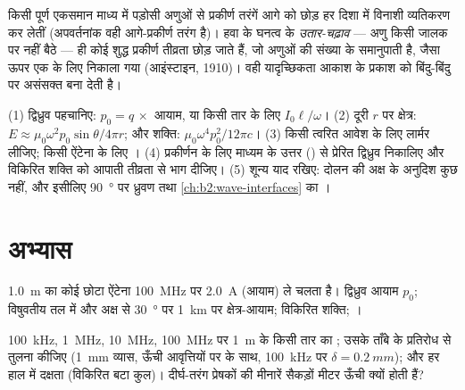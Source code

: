 \begin{remark}[नीला प्रकाश हम तक पहुँचता ही क्यों है]\label{rem:b2:dipole-radiation:why}
किसी पूर्ण एकसमान माध्य में पड़ोसी अणुओं से प्रकीर्ण तरंगें आगे को छोड़
हर दिशा में विनाशी व्यतिकरण कर लेतीं
(अपवर्तनांक वही आगे-प्रकीर्ण तरंग है)। हवा के घनत्व के
\emph{उतार-चढ़ाव} --- अणु किसी जालक पर नहीं बैठे --- ही कोई शुद्ध प्रकीर्ण तीव्रता
छोड़ जाते हैं, जो अणुओं की संख्या के समानुपाती है, जैसा ऊपर एक के लिए
निकाला गया (आइंस्टाइन, 1910)। वही यादृच्छिकता आकाश के प्रकाश को बिंदु-बिंदु
पर असंसक्त बना देती है।
\end{remark}

\begin{method}[विकिरण के आकलन]\label{met:b2:dipole-radiation:method}
(1) द्विध्रुव पहचानिए: $p_0 = q\,\times$ आयाम, या किसी तार के लिए $I_0\ell/\omega$।
(2) दूरी $r$ पर क्षेत्र: $E \approx \mu_0\omega^2p_0\sin\theta/4\pi r$; और शक्ति:
$\mu_0\omega^4p_0^2/12\pi c$। (3) किसी त्वरित आवेश के लिए लार्मर लीजिए; किसी
ऐंटेना के लिए । (4) प्रकीर्णन के लिए माध्यम के उत्तर
() से प्रेरित द्विध्रुव निकालिए और विकिरित शक्ति को
आपाती तीव्रता से भाग दीजिए। (5) शून्य याद रखिए:
दोलन की अक्ष के अनुदिश कुछ नहीं, और इसीलिए
\qty{90}{\degree} पर ध्रुवण तथा \cref{ch:b2:wave-interfaces} का ।
\end{method}

\section{अभ्यास}

\begin{exercise}[$\star$]\label{exo:b2:dipole-radiation:1}
\qty{1.0}{m} का कोई छोटा ऐंटेना \qty{100}{MHz} पर \qty{2.0}{A} (आयाम)
ले चलता है। द्विध्रुव आयाम $p_0$; विषुवतीय तल में और अक्ष से \qty{30}{\degree} पर
\qty{1}{km} पर क्षेत्र-आयाम; विकिरित शक्ति;
।
\end{exercise}

\begin{exercise}[$\star$]\label{exo:b2:dipole-radiation:2}
\qty{100}{kHz}, \qty{1}{MHz}, \qty{10}{MHz}, \qty{100}{MHz} पर \qty{1}{m} के किसी तार
का ; उसके ताँबे के प्रतिरोध से तुलना कीजिए
(\qty{1}{mm} व्यास, ऊँची आवृत्तियों पर  के साथ,
\qty{100}{kHz} पर $\delta = \qty{0.2}{mm}$); और हर हाल में दक्षता (विकिरित बटा कुल)।
दीर्घ-तरंग प्रेषकों की मीनारें सैकड़ों मीटर ऊँची क्यों होती
हैं?
\end{exercise}

